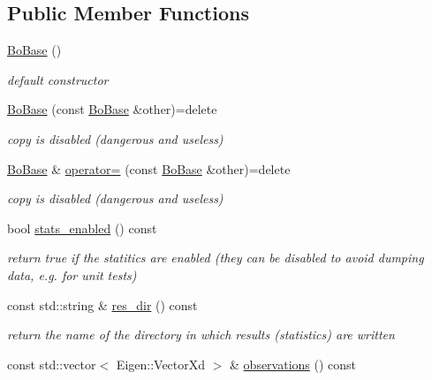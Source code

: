 \subsection*{Public Member Functions}
\begin{DoxyCompactItemize}
\item 
\hyperlink{classlimbo_1_1bayes__opt_1_1_bo_base_ad361278c23693c4220eaa9a9de5d3333}{Bo\+Base} ()
\begin{DoxyCompactList}\small\item\em default constructor \end{DoxyCompactList}\item 
\hyperlink{classlimbo_1_1bayes__opt_1_1_bo_base_a1a50eebb8a6efd528582ea871a0879a0}{Bo\+Base} (const \hyperlink{classlimbo_1_1bayes__opt_1_1_bo_base}{Bo\+Base} \&other)=delete
\begin{DoxyCompactList}\small\item\em copy is disabled (dangerous and useless) \end{DoxyCompactList}\item 
\hyperlink{classlimbo_1_1bayes__opt_1_1_bo_base}{Bo\+Base} \& \hyperlink{classlimbo_1_1bayes__opt_1_1_bo_base_a69628ced9d71209a59dcdfb7f5637265}{operator=} (const \hyperlink{classlimbo_1_1bayes__opt_1_1_bo_base}{Bo\+Base} \&other)=delete
\begin{DoxyCompactList}\small\item\em copy is disabled (dangerous and useless) \end{DoxyCompactList}\item 
bool \hyperlink{classlimbo_1_1bayes__opt_1_1_bo_base_a4d94db5c40b35bec292aebfd19b8fb3d}{stats\+\_\+enabled} () const 
\begin{DoxyCompactList}\small\item\em return true if the statitics are enabled (they can be disabled to avoid dumping data, e.\+g. for unit tests) \end{DoxyCompactList}\item 
const std\+::string \& \hyperlink{classlimbo_1_1bayes__opt_1_1_bo_base_a4c87b7618144f99027c294db3eb803f6}{res\+\_\+dir} () const 
\begin{DoxyCompactList}\small\item\em return the name of the directory in which results (statistics) are written \end{DoxyCompactList}\item 
const std\+::vector$<$ Eigen\+::\+Vector\+Xd $>$ \& \hyperlink{classlimbo_1_1bayes__opt_1_1_bo_base_a855dc5de1d0732a25f4c9730ac50d0bd}{observations} () const 

\end{DoxyCompactItemize}
